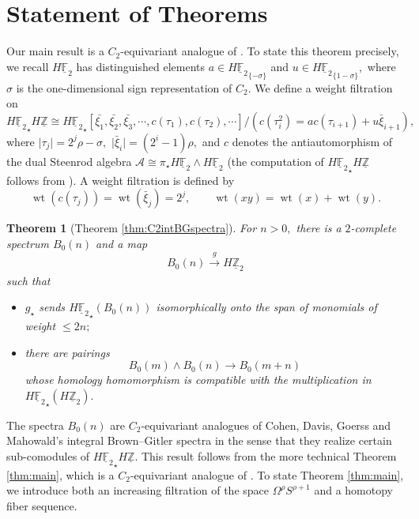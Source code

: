 \documentclass[]{amsart}  %
\newtheorem*{thm*}{Theorem}
\theoremstyle{definition}
\numberwithin{equation}{section}
\numberwithin{figure}{section}
\DeclareMathOperator{\wt}{wt}
\newcommand{\mF}{{\mathbb F}}
\newcommand{\mZ}{{\mathbb Z}}
\newcommand{\cA}{{\mathcal A}}
\newcommand{\umF}{\underline{\mF}}
\newcommand{\umZ}{\underline{\mZ}}
\newcommand{\bxi}{\bar{\xi}}
\newcommand{\0}{\langle 0 \rangle}
\begin{document}
\section{Statement of Theorems} Our main result is a $C_2$-equivariant analogue of \cite[Theorem~1.5(i),(ii)]{CDGM1988}. To state this theorem precisely, we recall ${H \umF_2}$ has distinguished elements $a \in H {\umF_2}_{\{-\sigma\}}$ and $u \in H {\umF_2}_{\{1 - \sigma\}},$ where $\sigma$ is the one-dimensional sign representation of $C_2$. We 
 define a weight filtration on 
$$ {H \umF_2}_\star H {\umZ} \cong H {\umF_2}_\star [\bar{\xi_1}, \bar{\xi_2}, \bar{\xi_3}, \cdots, c(\tau_1), c(\tau_2), \cdots ]/ (c(\tau_i^2) = a c(\tau_{i + 1}) + u \bar{\xi}_{i +1}),$$
	where $\vert \tau_j \vert = 2^j \rho - \sigma,$ $\vert \bar{\xi}_i \vert = (2^i - 1) \rho,$ and $c$ denotes the antiautomorphism of the dual Steenrod algebra $\cA \cong \pi_\star H \umF_2 \wedge H \umF_2$ (the computation of $H {\umF_2}_\star H \umZ$ follows from \cite[Theorem~3.8]{Ormsby2011}). A weight filtration is defined by 
	$$\wt(c(\tau_j)) = \wt(\bxi_j) = 2^j, \qquad \wt(xy) = \wt(x) + \wt(y). $$

\begin{thm*}[Theorem \ref{thm:C2intBGspectra}]
	For $n > 0,$ there is a $2$-complete spectrum $B_0(n)$ and a map 
	$$B_0(n) \xrightarrow[]{g} H {\umZ_{2}} $$
		such that
		\begin{itemize}
			\item[(i)] $g_\star$ sends $H {\umF_2}_\star(B_0(n))$ isomorphically onto the span of monomials of weight $\leq 2n;$
			\item[(ii)] there are pairings
			$$ B_0(m) \wedge B_0(n) \to B_0 (m + n) $$
			whose homology homomorphism is compatible with the multiplication in $H {\umF_2}_\star ( H \umZ_2 ).$
		\end{itemize}
	\end{thm*}

The spectra $B_0(n)$ are $C_2$-equivariant analogues of Cohen, Davis, Goerss and Mahowald's integral Brown--Gitler spectra in the sense that they realize certain sub-comodules of $H {\umF_2}_\star H \umZ.$ This result follows from the more technical Theorem \ref{thm:main}, which is a $C_2$-equivariant analogue of \cite[Theorem~1.3]{CDGM1988}. To state Theorem \ref{thm:main}, we introduce both an increasing filtration of the space $\Omega^\rho S^{\rho + 1}$ and a homotopy fiber sequence.
\end{document}

